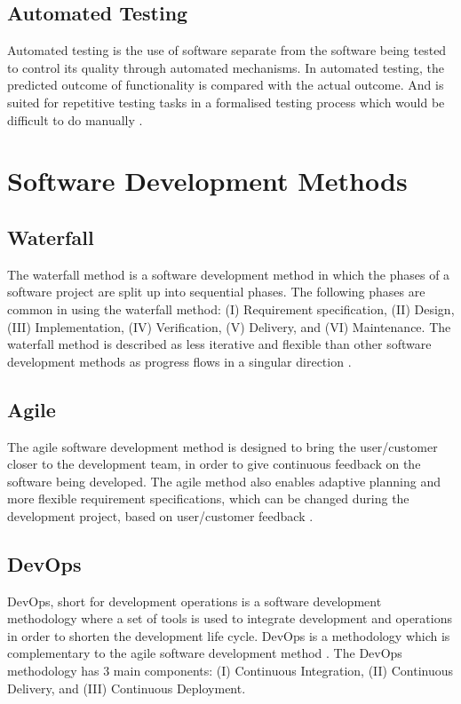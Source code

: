 \subsection{Automated Testing}
Automated testing is the use of software separate from the software being tested to control its quality through automated mechanisms. In automated testing, the predicted outcome of functionality is compared with the actual outcome. And is suited for repetitive testing tasks in a formalised testing process which would be difficult to do manually \cite{test_automation_wiki_2023}.

\section{Software Development Methods}
\subsection{Waterfall}
The waterfall method is a software development method in which the phases of a software project are split up into sequential phases. The following phases are common in using the waterfall method: (I) Requirement specification, (II) Design, (III) Implementation, (IV) Verification, (V) Delivery, and (VI) Maintenance. The waterfall method is described as less iterative and flexible than other software development methods as progress flows in a singular direction \cite{waterfall_model_wiki_2023}.

\subsection{Agile}
The agile software development method is designed to bring the user/customer closer to the development team, in order to give continuous feedback on the software being developed. The agile method also enables adaptive planning and more flexible requirement specifications, which can be changed during the development project, based on user/customer feedback \cite{agile_software_development_wiki_2023}.

\subsection{DevOps}
DevOps, short for development operations is a software development methodology where a set of tools is used to integrate development and operations in order to shorten the development life cycle. DevOps is a methodology which is complementary to the agile software development method \cite{devops_wiki_2023}. The DevOps methodology has 3 main components: (I) Continuous Integration, (II) Continuous Delivery, and (III) Continuous Deployment.

